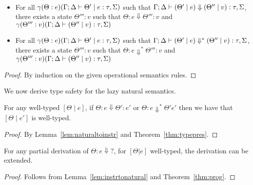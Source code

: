 \documentclass[acmsmall,review,anonymous,screen]{acmart}
\begin{document}
\begin{lemma}~\label{lem:instrtonatural}
  \begin{itemize}
\item  For all $\gamma(\Theta : e)(\Gamma ; \Delta \vdash \Theta' \mid
e : \tau,\Sigma)$ such that $\Gamma ; \Delta \vdash (\Theta' \mid e) \Downarrow
(\Theta'' \mid v) : \tau,\Sigma$, there exists a state $\Theta''' : v$
such that $\Theta : e \Downarrow \Theta''' : v$ and
$\gamma(\Theta''' : v)(\Gamma ; \Delta \vdash (\Theta'' \mid v) :
\tau,\Sigma)$
\item For all $\gamma(\Theta : e)(\Gamma ; \Delta \vdash \Theta' \mid
e : \tau,\Sigma)$ such that $\Gamma ; \Delta \vdash (\Theta' \mid e) \Downarrow^*
(\Theta'' \mid v) : \tau,\Sigma$, there exists a state $\Theta''' : v$
such that $\Theta : e \Downarrow^* \Theta''' : v$ and
$\gamma(\Theta''' : v)(\Gamma ; \Delta \vdash (\Theta'' \mid v) :
\tau,\Sigma)$
   \end{itemize}
 \end{lemma}
\begin{proof}
By induction on the given operational semantics rules.
  \end{proof}


  We now derive type safety for the lazy natural semantics.

  \begin{theorem}
For any well-typed $[\Theta \mid e]$, if $\Theta : e \Downarrow
\Theta' : e'$ or $\Theta : e \Downarrow^* \Theta' e'$ then we have
that $[\Theta \mid e']$ is well-typed.
\end{theorem}
\begin{proof}
By Lemma~\ref{lem:naturaltoinstr} and Theorem~\ref{thm:typepres}.
\end{proof}

\begin{theorem}[Progress]
For any partial derivation of $\Theta : e \Downarrow?$, for $[\Theta |
e]$ well-typed, the derivation can be extended.
\end{theorem}
\begin{proof}
Follows from Lemma~\ref{lem:instrtonatural} and Theorem~\ref{thm:prog}.
 \end{proof}



\end{document}
